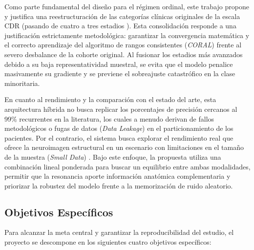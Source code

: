 \documentclass[12pt, oneside, english, spanish]{book}
\begin{document}
Como parte fundamental del diseño para el régimen ordinal, este trabajo propone y justifica una reestructuración de las categorías clínicas originales de la escala CDR (pasando de cuatro a tres estadios \cite{morris1993clinical}). Esta consolidación responde a una justificación estrictamente metodológica: garantizar la convergencia matemática y el correcto aprendizaje del algoritmo de rangos consistentes (\textit{CORAL}) frente al severo desbalance de la cohorte original. Al fusionar los estadios más avanzados debido a su baja representatividad muestral, se evita que el modelo penalice masivamente su gradiente y se previene el sobreajuste catastrófico en la clase minoritaria.

En cuanto al rendimiento y la comparación con el estado del arte, esta arquitectura híbrida no busca replicar los porcentajes de precisión cercanos al 99\% recurrentes en la literatura, los cuales a menudo derivan de fallos metodológicos o fugas de datos (\textit{Data Leakage}) en el particionamiento de los pacientes. Por el contrario, el sistema busca explorar el rendimiento real que ofrece la neuroimagen estructural en un escenario con limitaciones en el tamaño de la muestra (\textit{Small Data}) \cite{young2025, maierhein2020}. Bajo este enfoque, la propuesta utiliza una combinación lineal ponderada para buscar un equilibrio entre ambas modalidades, permitir que la resonancia aporte información anatómica complementaria y priorizar la robustez del modelo frente a la memorización de ruido aleatorio.

\subsection{Objetivos Específicos} \label{subsec:objetivos_especificos}
Para alcanzar la meta central y garantizar la reproducibilidad del estudio, el proyecto se descompone en los siguientes cuatro objetivos específicos:
\end{document}
